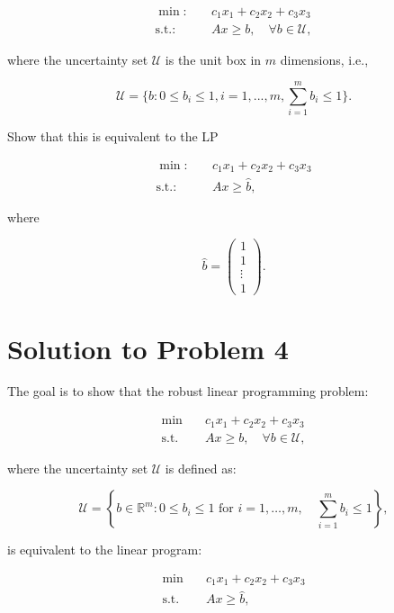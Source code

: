 \documentclass{article}
\begin{document}
\begin{align*}
\min : \quad & c_1x_1 + c_2x_2 + c_3x_3 \\
\text{s.t.} : \quad & Ax \geq b, \quad \forall b \in \mathcal{U},
\end{align*}

where the uncertainty set $\mathcal{U}$ is the unit box in $m$ dimensions, i.e.,

\[
\mathcal{U} = \{b : 0 \leq b_i \leq 1, i = 1, ..., m, \sum_{i=1}^m b_i \leq 1\}.
\]

Show that this is equivalent to the LP

\begin{align*}
\min : \quad & c_1x_1 + c_2x_2 + c_3x_3 \\
\text{s.t.} : \quad & Ax \geq \hat{b},
\end{align*}

where

\[
\hat{b} = 
\begin{pmatrix}
1 \\
1 \\
\vdots \\
1
\end{pmatrix}.
\]

\section{Solution to Problem 4}

The goal is to show that the robust linear programming problem:

\begin{align*}
\min \quad & c_1x_1 + c_2x_2 + c_3x_3 \\
\text{s.t.} \quad & Ax \geq b, \quad \forall b \in \mathcal{U},
\end{align*}

where the uncertainty set $\mathcal{U}$ is defined as:

\begin{equation*}
\mathcal{U} = \left\{ b \in \mathbb{R}^m : 0 \leq b_i \leq 1 \text{ for } i = 1, \dots, m, \quad \sum_{i=1}^m b_i \leq 1 \right\},
\end{equation*}

is equivalent to the linear program:

\begin{align*}
\min \quad & c_1x_1 + c_2x_2 + c_3x_3 \\
\text{s.t.} \quad & Ax \geq \hat{b},
\end{align*}
\end{document}
